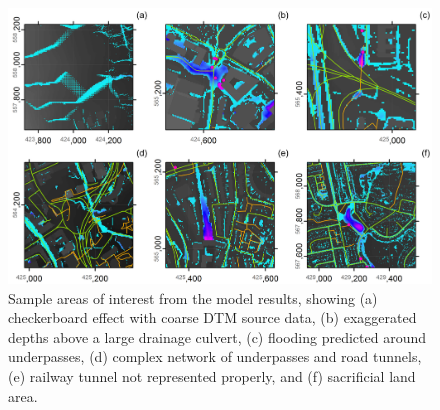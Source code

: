 \begin{figure}[tbp]
	\centering
	\includegraphics[width=1.0\textwidth]{newcastle-pluvial-figures/focal-areas.png}
	\caption{Sample areas of interest from the model results, showing (a) checkerboard effect with coarse DTM source data, (b) exaggerated depths above a large drainage culvert, (c) flooding predicted around underpasses, (d) complex network of underpasses and road tunnels, (e) railway tunnel not represented properly, and (f) sacrificial land area.}
	\label{Newcastle_Focal_Areas}
\end{figure}

